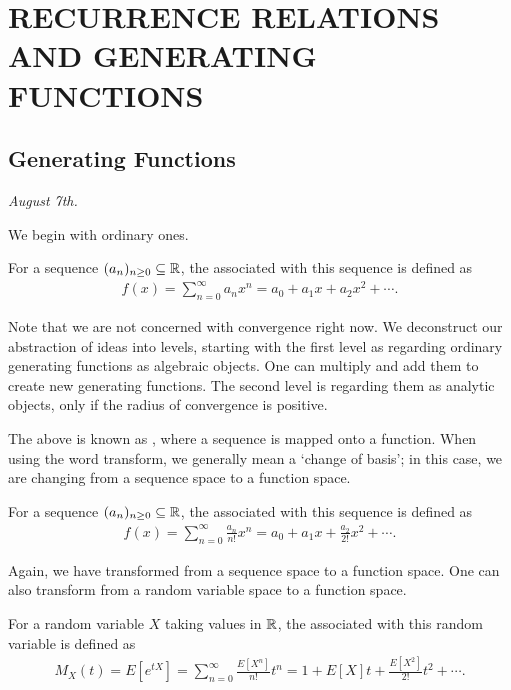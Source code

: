 \chapter{RECURRENCE RELATIONS AND GENERATING FUNCTIONS}

\section{Generating Functions}
\textit{August 7th.}

We begin with ordinary ones.

\begin{definition}
    For a sequence $(a_{n})_{n \geq 0} \subseteq \mathbb{R}$, the  associated with this sequence is defined as
    \begin{align}
        f(x) = \sum_{n=0}^{\infty} a_{n} x^{n} = a_{0} + a_{1}x + a_{2}x^{2} + \cdots.
    \end{align}
\end{definition}
Note that we are not concerned with convergence right now. We deconstruct our abstraction of ideas into levels, starting with the first level as regarding ordinary generating functions as algebraic objects. One can multiply and add them to create new generating functions. The second level is regarding them as analytic objects, only if the radius of convergence is positive. 

The above is known as , where a sequence is mapped onto a function. When using the word transform, we generally mean a `change of basis'; in this case, we are changing from a sequence space to a function space.

\begin{definition}
    For a sequence $(a_{n})_{n \geq 0} \subseteq \mathbb{R}$, the  associated with this sequence is defined as
    \begin{align}
        f(x) = \sum_{n=0}^{\infty} \frac{a_{n}}{n!} x^{n} = a_{0} + a_{1}x + \frac{a_{2}}{2!}x^{2} + \cdots.
    \end{align}
\end{definition}

Again, we have transformed from a sequence space to a function space. One can also transform from a random variable space to a function space.

\begin{definition}
    For a random variable $X$ taking values in $\mathbb{R}$, the  associated with this random variable is defined as
    \begin{align}
        M_{X}(t) = E[e^{tX}] = \sum_{n=0}^{\infty} \frac{E[X^{n}]}{n!} t^{n} = 1 + E[X]t + \frac{E[X^{2}]}{2!}t^{2} + \cdots.
    \end{align}
\end{definition}


